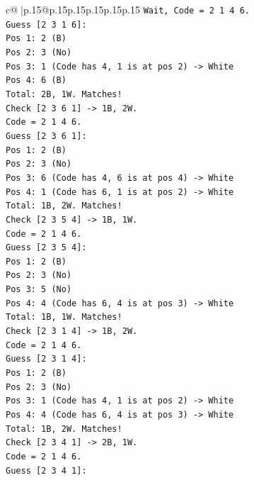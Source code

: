 \documentclass{article}
\begin{document}
{\begin{supertabular}{c@{$\;$}|p{.15\linewidth}@{}p{.15\linewidth}p{.15\linewidth}p{.15\linewidth}p{.15\linewidth}p{.15\linewidth}}
{{{\texttt{Wait, Code = 2 1 4 6.} \\
\texttt{Guess {[}2 3 1 6{]}:} \\
\texttt{Pos 1: 2 (B)} \\
\texttt{Pos 2: 3 (No)} \\
\texttt{Pos 3: 1 (Code has 4, 1 is at pos 2) {-}> White} \\
\texttt{Pos 4: 6 (B)} \\
\texttt{Total: 2B, 1W. Matches!} \\
\texttt{Check {[}2 3 6 1{]} {-}> 1B, 2W.} \\
\texttt{Code = 2 1 4 6.} \\
\texttt{Guess {[}2 3 6 1{]}:} \\
\texttt{Pos 1: 2 (B)} \\
\texttt{Pos 2: 3 (No)} \\
\texttt{Pos 3: 6 (Code has 4, 6 is at pos 4) {-}> White} \\
\texttt{Pos 4: 1 (Code has 6, 1 is at pos 2) {-}> White} \\
\texttt{Total: 1B, 2W. Matches!} \\
\texttt{Check {[}2 3 5 4{]} {-}> 1B, 1W.} \\
\texttt{Code = 2 1 4 6.} \\
\texttt{Guess {[}2 3 5 4{]}:} \\
\texttt{Pos 1: 2 (B)} \\
\texttt{Pos 2: 3 (No)} \\
\texttt{Pos 3: 5 (No)} \\
\texttt{Pos 4: 4 (Code has 6, 4 is at pos 3) {-}> White} \\
\texttt{Total: 1B, 1W. Matches!} \\
\texttt{Check {[}2 3 1 4{]} {-}> 1B, 2W.} \\
\texttt{Code = 2 1 4 6.} \\
\texttt{Guess {[}2 3 1 4{]}:} \\
\texttt{Pos 1: 2 (B)} \\
\texttt{Pos 2: 3 (No)} \\
\texttt{Pos 3: 1 (Code has 4, 1 is at pos 2) {-}> White} \\
\texttt{Pos 4: 4 (Code has 6, 4 is at pos 3) {-}> White} \\
\texttt{Total: 1B, 2W. Matches!} \\
\texttt{Check {[}2 3 4 1{]} {-}> 2B, 1W.} \\
\texttt{Code = 2 1 4 6.} \\
\texttt{Guess {[}2 3 4 1{]}:} \\
}}}
\end{supertabular}}
\end{document}

